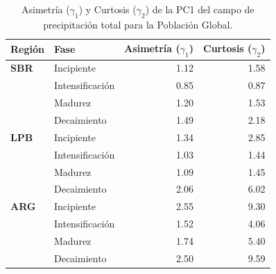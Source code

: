 \begin{table}[htbp]
\centering
\caption[Momentos estadísticos de la PC1 de precipitación - Población Global]{Asimetría ($\gamma_1$) y Curtosis ($\gamma_2$) de la PC1 del campo de precipitación total para la Población Global.}
\label{tab:momentos_global_tp}
\begin{tabular*}{\textwidth}{@{\extracolsep{\fill}}llrr}
\hline
\textbf{Región} & \textbf{Fase} & \textbf{Asimetría ($\gamma_1$)} & \textbf{Curtosis ($\gamma_2$)} \\
\hline
\textbf{SBR} & Incipiente & 1.12 & 1.58 \\
 & Intensificación & 0.85 & 0.87 \\
 & Madurez & 1.20 & 1.53 \\
 & Decaimiento & 1.49 & 2.18 \\
\hline
\textbf{LPB} & Incipiente & 1.34 & 2.85 \\
 & Intensificación & 1.03 & 1.44 \\
 & Madurez & 1.09 & 1.45 \\
 & Decaimiento & 2.06 & 6.02 \\
\hline
\textbf{ARG} & Incipiente & 2.55 & 9.30 \\
 & Intensificación & 1.52 & 4.06 \\
 & Madurez & 1.74 & 5.40 \\
 & Decaimiento & 2.50 & 9.59 \\
\hline
\end{tabular*}
\end{table}